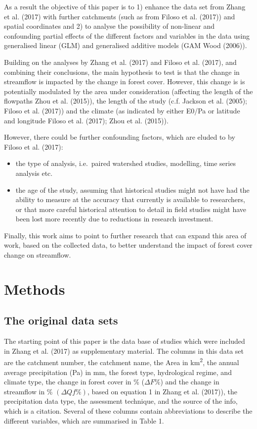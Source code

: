 \documentclass[]{elsarticle} %
\begin{document}
As a result the objective of this paper is to 1) enhance the data set from Zhang et al. (2017) with further catchments (such as from Filoso et al. (2017)) and spatial coordinates and 2) to analyse the possibility of non-linear and confounding partial effects of the different factors and variables in the data using generalised linear (GLM) and generalised additive models (GAM Wood (2006)).

Building on the analyses by Zhang et al. (2017) and Filoso et al. (2017), and combining their conclusions, the main hypothesis to test is that the change in streamflow is impacted by the change in forest cover. However, this change is is potentially modulated by the area under consideration (affecting the length of the flowpaths Zhou et al. (2015)), the length of the study (c.f. Jackson et al. (2005); Filoso et al. (2017)) and the climate (as indicated by either E0/Pa or latitude and longitude Filoso et al. (2017); Zhou et al. (2015)).

However, there could be further confounding factors, which are eluded to by Filoso et al. (2017):

\begin{itemize}
\item
  the type of analysis, i.e.~paired watershed studies, modelling, time series analysis etc.
\item
  the age of the study, assuming that historical studies might not have had the ability to measure at the accuracy that currently is available to researchers, or that more careful historical attention to detail in field studies might have been lost more recently due to reductions in research investment.
\end{itemize}

Finally, this work aims to point to further research that can expand this area of work, based on the collected data, to better understand the impact of forest cover change on streamflow.

\hypertarget{methods}{%
\section{Methods}\label{methods}}

\hypertarget{the-original-data-sets}{%
\subsection{The original data sets}\label{the-original-data-sets}}

The starting point of this paper is the data base of studies which were included in Zhang et al. (2017) as supplementary material. The columns in this data set are the catchment number, the catchment name, the Area in km\textsuperscript{2}, the annual average precipitation (Pa) in mm, the forest type, hydrological regime, and climate type, the change in forest cover in \% (\(\Delta F\%\)) and the change in streamflow in \% \((\Delta Qf\%)\), based on equation 1 in Zhang et al. (2017)), the precipitation data type, the assessment technique, and the source of the info, which is a citation.
Several of these columns contain abbreviations to describe the different variables, which are summarised in Table 1.
\end{document}
